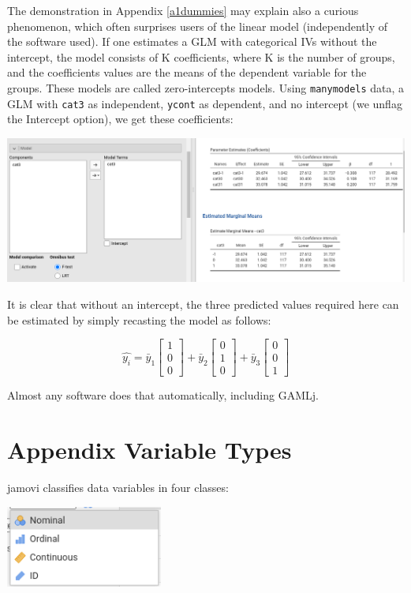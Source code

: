 \documentclass[
]{book}
\begin{document}
The demonstration in Appendix \ref{a1dummies} may explain also a curious phenomenon, which often surprises users of the linear model (independently of the software used). If one estimates a GLM with categorical IVs without the intercept, the model consists of K coefficients, where K is the number of groups, and the coefficients values are the means of the dependent variable for the groups. These models are called zero-intercepts models. Using \texttt{manymodels} data, a GLM with \texttt{cat3} as independent, \texttt{ycont} as dependent, and no intercept (we unflag the {Intercept} option), we get these coefficients:

\includegraphics{bookletpics/ap_a_output2.png}

It is clear that without an intercept, the three predicted values required here can be estimated by simply recasting the model as follows:

\[
\hat{y_i}=\bar{y}_1 \begin{bmatrix}
1 \\
0 \\
0
\end{bmatrix} +\bar{y}_2 \begin{bmatrix}
0 \\
1 \\
0
\end{bmatrix}+
\bar{y}_3 \begin{bmatrix}
0 \\
0 \\
1
\end{bmatrix}
\]

Almost any software does that automatically, including {GAMLj}.

\hypertarget{appendixb}{%
\chapter{Appendix Variable Types}\label{appendixb}}

{jamovi} classifies data variables in four classes:

\includegraphics{bookletpics/a_vartypes.png}
\end{document}
